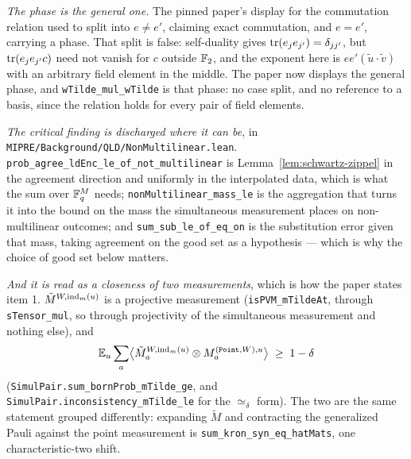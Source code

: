 \emph{The phase is the general one.} The pinned paper's display for the commutation relation used
to split into $e \neq e'$, claiming exact commutation, and $e = e'$, carrying a phase. That split is
false: self-duality gives $\operatorname{tr}(e_j e_{j'}) = \delta_{j j'}$, but $\operatorname{tr}(e_j e_{j'} c)$ need
not vanish for $c$ outside $\mathbb{F}_2$, and the exponent here is $e e' (\tilde{u} \cdot \tilde{v})$ with
an arbitrary field element in the middle. The paper now displays the general phase, and
\texttt{wTilde\_mul\_wTilde} is that phase: no case split, and no reference to a basis, since the
relation holds for every pair of field elements.

\emph{The critical finding is discharged where it can be}, in
\texttt{MIPRE/Background/QLD/NonMultilinear.lean}.
\texttt{prob\_agree\_ldEnc\_le\_of\_not\_multilinear} is Lemma~\ref{lem:schwartz-zippel} in the
agreement direction and uniformly in the interpolated data, which is what the sum over
$\mathbb{F}_q^M$ needs; \texttt{nonMultilinear\_mass\_le} is the aggregation that turns it into the bound
on the mass the simultaneous measurement places on non-multilinear outcomes; and
\texttt{sum\_sub\_le\_of\_eq\_on} is the substitution error given that mass, taking agreement on
the good set as a hypothesis --- which is why the choice of good set below matters.

\emph{And it is read as a closeness of two measurements}, which is how the paper states item 1.
$\tilde{M}^{W,\mathrm{ind}_m(u)}$ is a projective measurement (\texttt{isPVM\_mTildeAt}, through
\texttt{sTensor\_mul}, so through projectivity of the simultaneous measurement and nothing else),
and
\begin{equation*}
  \mathbb E_u \sum_a \bigl\langle \tilde{M}^{W,\mathrm{ind}_m(u)}_a \otimes
    M^{(\mathtt{Point}, W), u}_a \bigr\rangle \;\geq\; 1 - \delta
\end{equation*}
(\texttt{SimulPair.sum\_bornProb\_mTilde\_ge}, and
\texttt{SimulPair.inconsistency\_mTilde\_le} for the $\simeq_\delta$ form). The two are the same
statement grouped differently: expanding $\tilde{M}$ and contracting the generalized Pauli against
the point measurement is \texttt{sum\_kron\_syn\_eq\_hatMats}, one characteristic-two shift.

